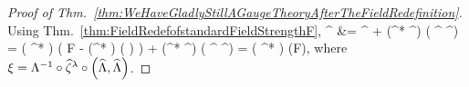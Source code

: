 \begin{proof}[Proof of Thm.~\ref{thm:WeHaveGladlyStillAGaugeTheoryAfterTheFieldRedefinition}]
Using Thm.~\ref{thm:FieldRedefofstandardFieldStrengthF},
\ba\label{FieldRedefOfGWithZeroZeta}
^\lambda
&=
^\lambda 
	+  \mleft({}^* \widehat{\zeta}^\lambda \mright) \mleft( ^\lambda  \stackrel{\wedge}{,} ^\lambda\mright)
=
\mleft( {}^* \Lambda \mright) \mleft(
		F
		-  \mleft({}^* \xi \mright) \mleft(  \stackrel{\wedge}{,}  	\mright)
\mright)
	+  \mleft({}^* \widehat{\zeta}^\lambda \mright) \mleft( ^\lambda  \stackrel{\wedge}{,} ^\lambda\mright)
=
\mleft( {}^* \Lambda \mright) (F),
\ea
where $\xi = \Lambda^{-1} \circ \widehat{\zeta}^\lambda \circ \mleft( \widehat{\Lambda}, \widehat{\Lambda} \mright)$. 

\end{proof}
